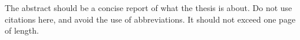 

\begin{abstracts}

The abstract should be a concise report of what the thesis is about. Do not use citations here, and avoid the use of abbreviations.
It should not exceed one page of length.

\end{abstracts}
